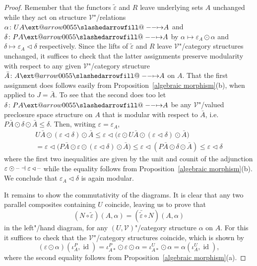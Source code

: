 \documentclass[preprint, a4paper]{elsarticle}
\makeatletter
\def\slashedarrowfill@#1#2#3#4#5{%
  $\m@th\thickmuskip0mu\medmuskip\thickmuskip\thinmuskip\thickmuskip
   \relax#5#1\mkern-7mu%
   \cleaders\hbox{$#5\mkern-2mu#2\mkern-2mu$}\hfill
   \mathclap{#3}\mathclap{#2}%
   \cleaders\hbox{$#5\mkern-2mu#2\mkern-2mu$}\hfill
   \mkern-7mu#4$%
}
\def\rightslashedarrowfill@{%
  \slashedarrowfill@\relbar\relbar\mapstochar\rightarrow}
\newcommand\xslashedrightarrow[2][]{%
  \ext@arrow 0055{\rightslashedarrowfill@}{#1}{#2}}
\def\slashedrightarrow{\xslashedrightarrow{}}
\theoremstyle{definition}
\theoremstyle{remark}
\providecommand{\propref}[1]{Proposition~\ref{#1}}
\providecommand{\of}{\circ}
\providecommand{\eps}{\varepsilon}
\newcommand{\dash}{\textup{--}}
\providecommand{\bigpars}[1]{\bigl(#1\bigr)}
\providecommand{\hmap}[3]{#1\colon#2\slashedrightarrow#3}
\DeclareMathOperator{\id}{id}
\providecommand{\ladj}{\dashv}
\providecommand{\catvar}[1]{\mathcal{#1}}
\providecommand{\2}{\mathsf 2}
\providecommand{\V}{\catvar V}
\providecommand{\hc}{\odot}
\providecommand{\lhom}{\triangleleft}
\makeatother
\begin{document}
	\begin{proof}
		Remember that the functors $\tilde\eps$ and $R$ leave underlying sets $A$ unchanged while they act on structure $\V$"/relations $\hmap\alpha{UA}A$ and $\hmap\delta{PA}A$ by $\alpha \mapsto \eps_A \hc \alpha$ and $\delta \mapsto \eps_A \lhom \delta$ respectively. Since the lifts of $\tilde\eps$ and $R$ leave $\V$"/category structures unchanged, it suffices to check that the latter assignments preserve modularity with respect to any given $\V$"/category structure $\hmap{\bar A}AA$ on $A$. That the first assignment does follows easily from \propref{algebraic morphism}(b), when applied to $J = \bar A$. To see that the second does too let $\hmap\delta{PA}A$ be any $\V$"/valued preclosure space structure on $A$ that is modular with respect to $\bar A$, i.e.\ $P\bar A \hc \delta \hc \bar A \leq \delta$. Then, writing $\eps = \eps_A$,
		\begin{multline*}
			U\bar A \hc (\eps \lhom \delta) \hc \bar A \leq \eps \lhom \bigpars{\eps \hc U\bar A \hc (\eps \lhom \delta) \hc \bar A} \\
			= \eps \lhom \bigpars{P\bar A \hc \eps \hc (\eps \lhom \delta) \hc \bar A} \leq \eps \lhom (P\bar A \hc \delta \hc \bar A) \leq \eps \lhom \delta
		\end{multline*}
		where the first two inequalities are given by the unit and counit of the adjunction $\eps \hc \dash \ladj \eps \lhom \dash$ while the equality follows from \propref{algebraic morphism}(b). We conclude that $\eps_A \lhom \delta$ is again modular.
		
		It remains to show the commutativity of the diagrams. It is clear that any two parallel composites containing $U$ coincide, leaving us to prove that
		\begin{displaymath}
			(N \of \tilde\eps)(A, \alpha) = (\bar{\tilde\eps} \of N)(A, \alpha)
		\end{displaymath}
		in the left"/hand diagram, for any $(U, \V)$"/category structure $\alpha$ on $A$. For this it suffices to check that the $\V$"/category structures coincide, which is shown by
		\begin{displaymath}
			(\eps \hc \alpha)(\iota_A^P, \id) = \iota_{A*}^P \hc \eps \hc \alpha = \iota_{A*}^U \hc \alpha = \alpha(\iota_A^U, \id),
		\end{displaymath}
		where the second equality follows from \propref{algebraic morphism}(a).
	\end{proof}
\end{document}
